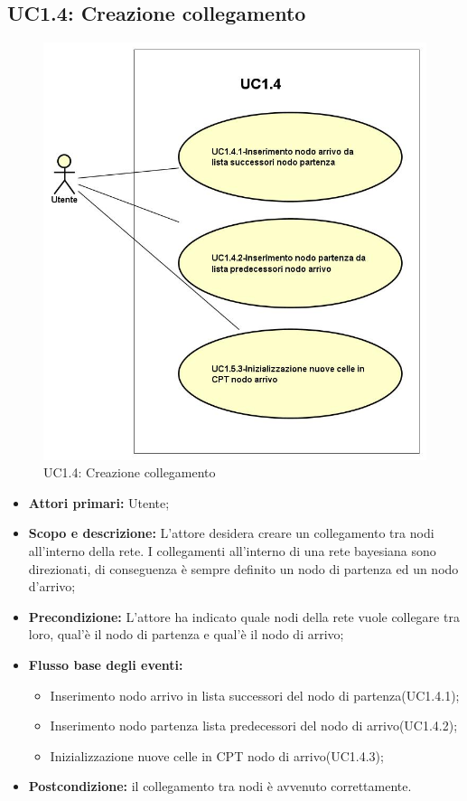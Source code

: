 \subsection{UC1.4: Creazione collegamento} 
\begin{figure} [H]
	\centering
	\includegraphics[scale=0.45]{Img/UC1-4} 
	\caption{UC1.4: Creazione collegamento} \label{} 
\end{figure} 
\begin{itemize} 
	\item{\textbf{Attori primari:} Utente;} 
	\item{\textbf{Scopo e descrizione:} L'attore desidera creare un collegamento tra nodi all'interno della rete. I collegamenti all'interno di una rete bayesiana sono direzionati, di conseguenza è sempre definito un nodo di partenza ed un nodo d'arrivo;} 
	\item{\textbf{Precondizione:} L'attore ha indicato quale nodi della rete vuole collegare tra loro, qual'è il nodo di partenza e qual'è il nodo di arrivo;} 
	\item{\textbf{Flusso base degli eventi:} } 
		\begin{itemize} 
			\item{Inserimento nodo arrivo in lista successori del nodo di partenza(UC1.4.1);} 
			\item{Inserimento nodo partenza lista predecessori del nodo di arrivo(UC1.4.2);} 
			\item{Inizializzazione nuove celle in CPT nodo di arrivo(UC1.4.3);} 
		\end{itemize} 
	\item{\textbf{Postcondizione:} il collegamento tra nodi è avvenuto correttamente.} 
\end{itemize} 
